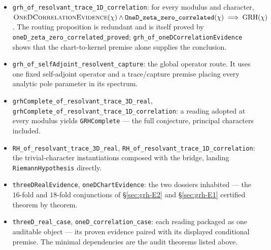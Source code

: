\documentclass[11pt]{article}
\theoremstyle{definition}
\begin{document}
\begin{itemize}
equality embedded in the legacy premise.
\item \texttt{grh\_of\_resolvant\_trace\_1D\_correlation}: for every modulus
and character, \(\textsc{OneDCorrelationEvidence}(\chi)\wedge
\texttt{OneD\_zeta\_zero\_correlated}(\chi)\implies\mathrm{GRH}(\chi)\).
The routing proposition is redundant and is itself proved by
\texttt{oneD\_zeta\_zero\_correlated\_proved};
\texttt{grh\_of\_oneDCorrelationEvidence} shows that the chart-to-kernel
premise alone supplies the conclusion.
\item \texttt{grh\_of\_selfAdjoint\_resolvent\_capture}: the global operator
route.  It uses one fixed self-adjoint operator and a trace/capture premise
placing every analytic pole parameter in its spectrum.
\item \texttt{grhComplete\_of\_resolvant\_trace\_3D\_real},
\texttt{grhComplete\_of\_resolvant\_trace\_1D\_correlation}: a reading
adopted at every modulus yields \texttt{GRHComplete} --- the full
conjecture, principal characters included.
\item \texttt{RH\_of\_resolvant\_trace\_3D\_real},
\texttt{RH\_of\_resolvant\_trace\_1D\_correlation}: the trivial-character
instantiations composed with the bridge, landing \texttt{RiemannHypothesis}
directly.
\item \texttt{threeDRealEvidence}, \texttt{oneDChartEvidence}: the two
dossiers inhabited --- the \(16\)-fold and \(18\)-fold conjunctions of
\S\ref{sec:grh-E2} and \S\ref{sec:grh-E1} certified theorem by theorem.
\item \texttt{threeD\_real\_case}, \texttt{oneD\_correlation\_case}: each
reading packaged as one auditable object --- its proven evidence paired with
its displayed conditional premise.  The minimal dependencies are the audit
theorems listed above.
\end{itemize}
\end{document}
